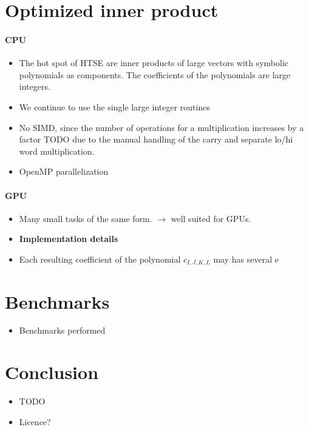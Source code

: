\documentclass[oribibl]{llncs2e/llncs}
\begin{document}
\section{Optimized inner product}
\paragraph{CPU}
\begin{itemize}
\item The hot spot of HTSE are inner products of large vectors with symbolic polynomials as components. The coefficients of the polynomials are large integers.
\item We continue to use the single large integer routines
\item No SIMD, since the number of operations for a multiplication increases by a factor TODO due to the manual handling of the carry and separate lo/hi word multiplication.
\item OpenMP parallelization
\end{itemize}
\paragraph{GPU}
\begin{itemize}
\item Many small tasks of the same form. $\rightarrow$ well suited for GPUs.
\item {\bf Implementation details}
\item Each resulting coefficient of the polynomial $c_{I,J,K,L}$ may has several e
\end{itemize}

\section{Benchmarks}
\begin{itemize}
\item Benchmarks performed
\end{itemize}


\section{Conclusion}
\begin{itemize}
\item TODO
\item Licence?
\end{itemize}

\end{document}
